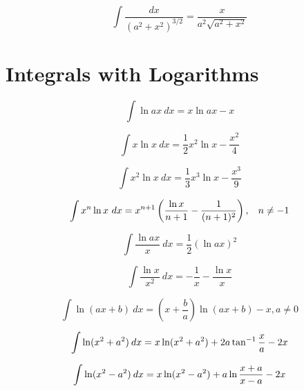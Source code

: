 \begin{equation}\label{eq:Winokur2}
\int\frac{dx}{(a^2+x^2)^{3/2}}=\frac{x}{a^2\sqrt{a^2+x^2}}
\end{equation}



\section*{Integrals with Logarithms}

\begin{equation}
\int \ln ax\  dx = x \ln ax - x 
\end{equation}

\begin{equation}
\int x \ln x \ dx = \frac{1}{2} x^2 \ln x-\frac{x^2}{4}
\end{equation}

\begin{equation}
\int x^2 \ln x \ dx = \frac{1}{3} x^3 \ln x-\frac{x^3}{9}
\end{equation}

\begin{equation}
\int x^n \ln x\ dx = x^{n+1}\left( \dfrac{\ln x}{n+1}-\dfrac{1}{(n+1)^2}\right),\hspace{2ex} n\neq -1
\end{equation}


\begin{equation}
\int \frac{\ln ax}{x}\ dx = \frac{1}{2}\left ( \ln ax \right)^2 
\end{equation}

\begin{equation}
\int \frac{\ln x}{x^2}\ dx = -\frac{1}{x}-\frac{\ln x}{x}
\end{equation}

\begin{equation}
\int \ln (ax + b) \ dx = \left ( x + \frac{b}{a} \right) \ln (ax+b) - x , a\ne 0
\end{equation}

\begin{equation}
\int \ln  ( x^2 + a^2 )\hspace{.5ex} {dx} = x \ln (x^2 + a^2  ) +2a\tan^{-1} \frac{x}{a} - 2x 
\end{equation}

\begin{equation}
\int \ln  ( x^2 - a^2 )\hspace{.5ex} {dx} = x \ln (x^2 - a^2  ) +a\ln \frac{x+a}{x-a} - 2x 
\end{equation}

